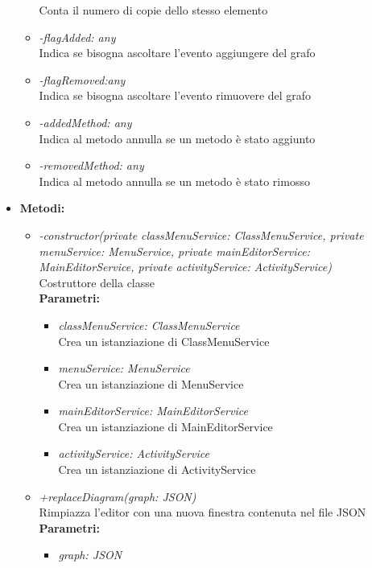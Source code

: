 \begin{itemize}
\begin{itemize}
			Conta il numero di copie dello stesso elemento
			\item \emph{-flagAdded: any}\\
			Indica se bisogna ascoltare l'evento aggiungere del grafo
			\item \emph{-flagRemoved:any}\\
			Indica se bisogna ascoltare l'evento rimuovere del grafo
			\item \emph{-addedMethod: any}\\
			Indica al metodo annulla se un metodo è stato aggiunto
			\item \emph{-removedMethod: any}\\
			Indica al metodo annulla se un metodo è stato rimosso
		\end{itemize}
	\item \textbf{Metodi:}
		\begin{itemize}
			\item \emph{-constructor(private classMenuService: ClassMenuService, private menuService: MenuService, private mainEditorService: MainEditorService, private activityService: ActivityService)}\\
    		Costruttore della classe\\
    		\textbf{Parametri:}
    		\begin{itemize}
    			\item \emph{classMenuService: ClassMenuService}\\
    			Crea un istanziazione di ClassMenuService
    			\item \emph{menuService: MenuService}\\
    			Crea un istanziazione di MenuService
    			\item \emph{mainEditorService: MainEditorService}\\
    			Crea un istanziazione di MainEditorService
    			\item \emph{activityService: ActivityService}\\
    			Crea un istanziazione di ActivityService
    		\end{itemize}
    		\item \emph{+replaceDiagram(graph: JSON)}\\
    		Rimpiazza l'editor con una nuova finestra contenuta nel file JSON\\
    		\textbf{Parametri:}
    		\begin{itemize}
    			\item \emph{graph: JSON}\\

\end{itemize}
\end{itemize}
\end{itemize}
